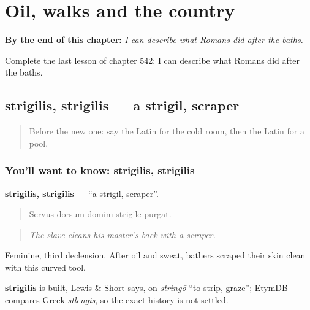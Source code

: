 
\chapter{Oil, walks and the country}
\label{ch:la-oil-walks-and-the-country}

\begin{chapteropening}
\textbf{By the end of this chapter:} \emph{I can describe what Romans did after the baths.}

Complete the last lesson of chapter 542: I can describe what Romans did after the baths.
\end{chapteropening}

\section[strigilis, strigilis]{strigilis, strigilis — a strigil, scraper}

\label{lesson:LA-C542-strigilis}



\begin{quote}
Before the new one: say the Latin for the cold room, then the Latin for a pool.
\end{quote}

\subsection*{You'll want to know: strigilis, strigilis}
\textbf{strigilis, strigilis} — \textquotedblleft{}a strigil, scraper\textquotedblright{}.

\begin{quote}
Servus dorsum dominī strigile pūrgat.
\end{quote}

\begin{quote}
\emph{The slave cleans his master's back with a scraper.}
\end{quote}

Feminine, third declension. After oil and sweat, bathers scraped their skin clean with this curved tool.

\begin{cousinweb}
\textbf{strigilis} is built, Lewis \& Short says, on \emph{stringō} \textquotedblleft{}to strip, graze\textquotedblright{}; EtymDB compares Greek \emph{stlengis}, so the exact history is not settled.
\end{cousinweb}

